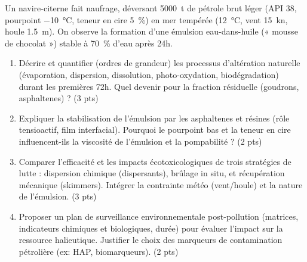 \documentclass[11pt]{article}
\begin{document}
\begin{exercice}
Un navire-citerne fait naufrage, déversant \SI{5000}{\tonne} de pétrole brut léger (API 38, pourpoint \SI{-10}{\celsius}, teneur en cire \SI{5}{\%}) en mer tempérée (\SI{12}{\celsius}, vent \SI{15}{\knot}, houle \SI{1.5}{\meter}). On observe la formation d'une émulsion eau-dans-huile (« mousse de chocolat ») stable à \SI{70}{\%} d'eau après 24h.

\begin{enumerate}
\item Décrire et quantifier (ordres de grandeur) les processus d'altération naturelle (évaporation, dispersion, dissolution, photo-oxydation, biodégradation) durant les premières 72h. Quel devenir pour la fraction résiduelle (goudrons, asphaltenes) ? \hfill (3 pts)
\item Expliquer la stabilisation de l'émulsion par les asphaltenes et résines (rôle tensioactif, film interfacial). Pourquoi le pourpoint bas et la teneur en cire influencent-ils la viscosité de l'émulsion et la pompabilité ? \hfill (2 pts)
\item Comparer l'efficacité et les impacts écotoxicologiques de trois stratégies de lutte : dispersion chimique (dispersants), brûlage in situ, et récupération mécanique (skimmers). Intégrer la contrainte météo (vent/houle) et la nature de l'émulsion. \hfill (3 pts)
\item Proposer un plan de surveillance environnementale post-pollution (matrices, indicateurs chimiques et biologiques, durée) pour évaluer l'impact sur la ressource halieutique. Justifier le choix des marqueurs de contamination pétrolière (ex: HAP, biomarqueurs). \hfill (2 pts)
\end{enumerate}
\end{exercice}
\end{document}
